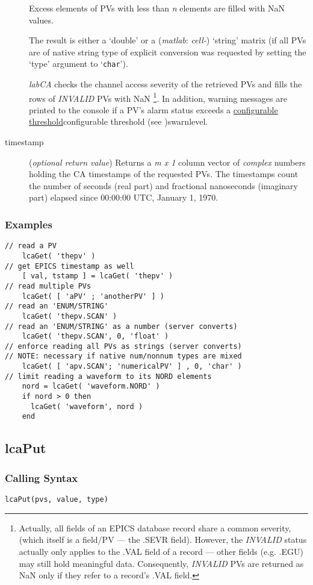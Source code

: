 \documentclass{article}
\newcommand{\sca}{\ita{labCA}}
\newcommand{\matlab}{\ita{matlab}}
\newcommand{\com}[1]{{\tt #1}}
\newcommand{\NAN}{\mbox{NaN}}
\newcommand{\ita}[1]{\emph{#1}}
\newcommand{\n}{$n$}
\newcommand{\mxl}{$m\times 1$}
\renewcommand{\n}{\ita{n}}
\renewcommand{\mxl}{\ita{m x 1}}
\begin{document}
\begin{description}
Excess elements of PVs with less than \n{} elements are filled with
\NAN{} values.

The result is either a `double' or a (\matlab: \ita{cell-}) `string'
matrix (if all PVs are of native string type of explicit conversion
was requested by setting the `type' argument to `\com{char}').

\sca{} checks the channel access severity of the retrieved PVs and
fills the rows of \ita{INVALID} PVs with \NAN%
\footnote{
Actually, all fields of an EPICS database record share a common
severity, (which itself is a field/PV --- the .SEVR field). However,
the \ita{INVALID} status actually only applies to the .VAL field
of a record --- other fields (e.g. .EGU) may still hold meaningful data.
Consequently, \ita{INVALID} PVs are returned as \NAN{} only if
they refer to a record's .VAL field.
}. In addition, warning
messages are printed to the console if a PV's alarm status exceeds
a \hyperref[ref]{configurable threshold}{configurable threshold (see }{ )}{swarnlevel}.
%
%
\item[timestamp] (\ita{optional return value}) Returns a \mxl{}
column vector of \ita{complex} numbers holding the CA timestamps of
the requested PVs. The timestamps count the number of seconds (real part)
and fractional nanoseconds (imaginary part) elapsed since
00:00:00 UTC, January 1, 1970.
\end{description}
\subsubsection{Examples}
\begin{verbatim}
// read a PV
    lcaGet( 'thepv' )
// get EPICS timestamp as well
    [ val, tstamp ] = lcaGet( 'thepv' )
// read multiple PVs
    lcaGet( [ 'aPV' ; 'anotherPV' ] )
// read an 'ENUM/STRING'
    lcaGet( 'thepv.SCAN' )
// read an 'ENUM/STRING' as a number (server converts)
    lcaGet( 'thepv.SCAN', 0, 'float' )
// enforce reading all PVs as strings (server converts)
// NOTE: necessary if native num/nonnum types are mixed
    lcaGet( [ 'apv.SCAN'; 'numericalPV' ] , 0, 'char' )
// limit reading a waveform to its NORD elements
    nord = lcaGet( 'waveform.NORD' )
	if nord > 0 then
      lcaGet( 'waveform', nord )
	end
\end{verbatim}

\subsection{lcaPut}
\label{lcaput}
\subsubsection{Calling Syntax}
\begin{verbatim}
lcaPut(pvs, value, type)
\end{verbatim}
\end{document}
